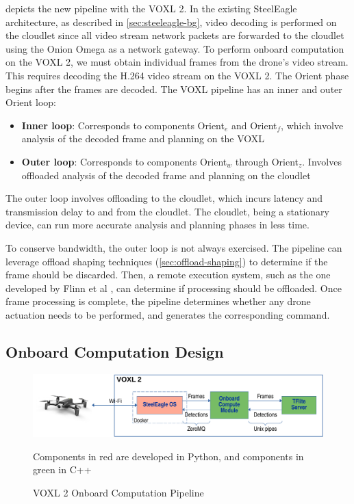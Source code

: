  depicts the new pipeline with the VOXL 2.
In the existing SteelEagle architecture, as described in
\cref{sec:steeleagle-bg}, video decoding is performed on the cloudlet since all
video stream network packets are forwarded to the cloudlet using the Onion
Omega as a network gateway. To perform onboard computation on the VOXL 2, we
must obtain individual frames from the drone's video stream.  This requires
decoding the H.264 video stream on the VOXL 2. The Orient phase begins after
the frames are decoded.  The VOXL pipeline has an inner and outer Orient loop:
\begin{itemize}
    \item \textbf{Inner loop}: Corresponds to components Orient$_e$ and
        Orient$_f$, which involve analysis of the decoded frame and planning
        on the VOXL
    \item \textbf{Outer loop}: Corresponds to components Orient$_w$ through
        Orient$_z$. Involves offloaded analysis of the decoded frame and
        planning on the cloudlet
\end{itemize}

The outer loop involves offloading to the cloudlet, which incurs latency and
transmission delay to and from the cloudlet. The cloudlet, being a stationary
device, can run more accurate analysis and planning phases in less time.

To conserve bandwidth, the outer loop is not always exercised.  The pipeline
can leverage offload shaping techniques (\cref{sec:offload-shaping}) to
determine if the frame should be discarded. Then, a remote execution system,
such as the one developed by Flinn et al \cite{flinn2002}, can determine if
processing should be offloaded. Once frame processing is complete, the pipeline
determines whether any drone actuation needs to be performed, and generates the
corresponding command.

\subsection{Onboard Computation Design}

\begin{figure}[htbp]
\centering
\includegraphics[width = .9\textwidth]{figs/onboard-design-crop.pdf}
\begin{captext}
Components in red are developed in Python, and components in green in C++
\end{captext}
\caption{VOXL 2 Onboard Computation Pipeline}
\label{fig:voxl2-onboard-pipeline}
\end{figure}

